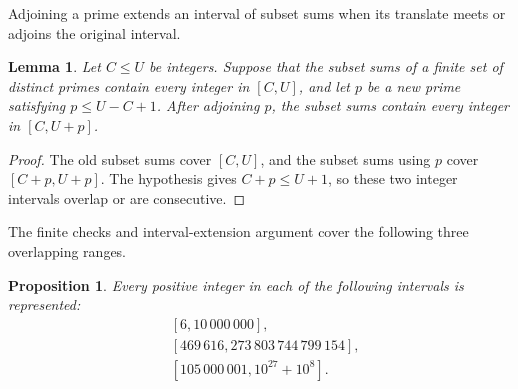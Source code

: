 \documentclass[11pt,letterpaper,reqno]{amsart}
\numberwithin{equation}{section}
\newtheorem{lemma}[theorem]{Lemma}
\newtheorem{proposition}[theorem]{Proposition}
\theoremstyle{remark}
\newcommand{\1}{\mathbf 1}
\renewcommand{\leq}{\leqslant}
\begin{document}
Adjoining a prime extends an interval of subset sums when its translate meets or adjoins the original interval.

\begin{lemma}
\label{lem:fraiture-extension}
Let $C\leq U$ be integers. Suppose that the subset sums of a finite set
of distinct primes contain every integer in $[C,U]$, and let $p$ be a new prime satisfying
$p\leq U-C+1$. After adjoining $p$, the subset sums contain every integer
in $[C,U+p]$.
\end{lemma}

\begin{proof}
The old subset sums cover $[C,U]$, and the subset sums using $p$ cover
$[C+p,U+p]$. The hypothesis gives $C+p\leq U+1$, so these two integer
intervals overlap or are consecutive.
\end{proof}

The finite checks and interval-extension argument cover the following three overlapping ranges.

\begin{proposition}
\label{prop:fraiture-finite}
Every positive integer in each of the following intervals is represented:
\begin{align}
 &[6,10\,000\,000],
 \label{eq:fraiture-small}\\
 &[469\,616,273\,803\,744\,799\,154],
 \label{eq:fraiture-first-window}\\
 &[105\,000\,001,10^{27}+10^8].
 \label{eq:fraiture-large-window}
\end{align}
\end{proposition}
\end{document}
